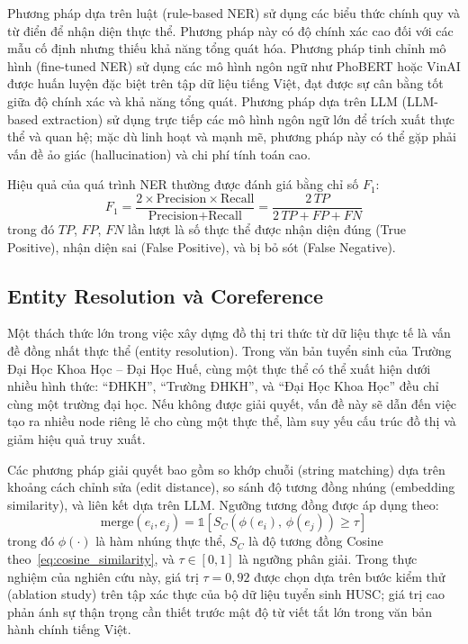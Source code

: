 \documentclass[12pt,a4paper]{report}
\theoremstyle{plain}
\theoremstyle{definition}
\begin{document}
	Phương pháp dựa trên luật (rule-based NER) sử dụng các biểu thức chính quy
	và từ điển để nhận diện thực thể. Phương pháp này có độ chính xác cao đối với
	các mẫu cố định nhưng thiếu khả năng tổng quát hóa. Phương pháp tinh chỉnh mô
	hình (fine-tuned NER) sử dụng các mô hình ngôn ngữ như PhoBERT hoặc VinAI được
	huấn luyện đặc biệt trên tập dữ liệu tiếng Việt, đạt được sự cân bằng tốt giữa
	độ chính xác và khả năng tổng quát. Phương pháp dựa trên LLM (LLM-based
	extraction) sử dụng trực tiếp các mô hình ngôn ngữ lớn để trích xuất thực thể
	và quan hệ; mặc dù linh hoạt và mạnh mẽ, phương pháp này có thể gặp phải vấn
	đề ảo giác (hallucination) và chi phí tính toán cao.
	
	Hiệu quả của quá trình NER thường được đánh giá bằng chỉ số $F_1$:
	\begin{equation}
		F_1 = \frac{2 \times \text{Precision} \times \text{Recall}}
		{\text{Precision} + \text{Recall}}
		= \frac{2\,TP}{2\,TP + FP + FN}
		\label{eq:f1_ner}
	\end{equation}
	trong đó $TP$, $FP$, $FN$ lần lượt là số thực thể được nhận diện đúng (True
	Positive), nhận diện sai (False Positive), và bị bỏ sót (False Negative).
	
	\subsection{Entity Resolution và Coreference}
	\label{subsec:entity_resolution}
	
	Một thách thức lớn trong việc xây dựng đồ thị tri thức từ dữ liệu thực tế là
	vấn đề đồng nhất thực thể (entity resolution). Trong văn bản tuyển sinh của
	Trường Đại Học Khoa Học -- Đại Học Huế, cùng một thực thể có thể xuất hiện
	dưới nhiều hình thức: ``ĐHKH'', ``Trường ĐHKH'', và ``Đại Học Khoa Học'' đều
	chỉ cùng một trường đại học. Nếu không được giải quyết, vấn đề này sẽ dẫn đến
	việc tạo ra nhiều node riêng lẻ cho cùng một thực thể, làm suy yếu cấu trúc
	đồ thị và giảm hiệu quả truy xuất.
	
	Các phương pháp giải quyết bao gồm so khớp chuỗi (string matching) dựa trên
	khoảng cách chỉnh sửa (edit distance), so sánh độ tương đồng nhúng (embedding
	similarity), và liên kết dựa trên LLM. Ngưỡng tương đồng được áp dụng theo:
	\begin{equation}
		\text{merge}(e_i, e_j)
		= \mathbb{1}\!\left[
		S_C\!\left(\phi(e_i),\,\phi(e_j)\right) \geq \tau
		\right]
		\label{eq:entity_resolution}
	\end{equation}
	trong đó $\phi(\cdot)$ là hàm nhúng thực thể, $S_C$ là độ tương đồng Cosine
	theo~\eqref{eq:cosine_similarity}, và $\tau \in [0,1]$ là ngưỡng phân giải.
	Trong thực nghiệm của nghiên cứu này, giá trị $\tau = 0{,}92$ được chọn dựa
	trên bước kiểm thử (ablation study) trên tập xác thực của bộ dữ liệu tuyển
	sinh HUSC; giá trị cao phản ánh sự thận trọng cần thiết trước mật độ từ viết
	tắt lớn trong văn bản hành chính tiếng Việt.
	
\end{document}
